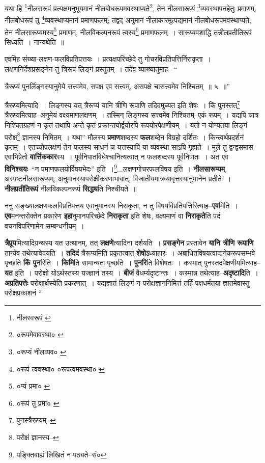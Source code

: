 \documentclass[article,12pt,a4paper]{memoir}
\begin{document}
	यथा हि \footnote{नीलस्वरूपं \cite{dp-msC} \cite{dp-msD}}\-नीलसरूपं प्रत्यक्षमनुभूयमानं नीलबोधरूपमवस्थाप्यते\footnote{०रूपमेवावस्था० \cite{dp-msC}}\-, तेन नीलसारूप्यं \footnote{०रूप्यं नीलव्यव० \cite{dp-msC}}\-व्यवस्थापनहेतुः प्रमाणम्, नीलबोधरूपं तु \footnote{०रूपं त्ववस्था० \cite{dp-msD} ०रूपत्वमवस्था० \cite{dp-msC}}\-व्यवस्थाप्यमानं प्रमाणफलम्; तद्वद् अनुमानं नीलाकारमुत्पद्यमानं नीलबोधरूपमवस्थाप्यते, तेन नीलसारूप्यमस्य\footnote{०प्यं प्रमा० \cite{dp-msC}} प्रमाणम्, नीलविकल्पनरूपं त्वस्य\footnote{०रूपं तु प्रमा० \cite{dp-msB} \cite{dp-msD}} प्रमाणफलम् । सारूप्यवशाद्धि तन्नीलप्रतीतिरूपं सिध्यति । नान्यथेति ॥ 
	  
	एवमिह संख्या-लक्षण-फलविप्रतिपत्तयः । प्रत्यक्षपरिच्छेदे तु गोचरविप्रतिपत्तिर्निराकृता । लक्षणनिर्देशप्रसङ्गेन तु त्रिरूपं लिङ्गं प्रस्तुतम् । तदेव व्याख्यातुमाह-- “
	  
	त्रैरूप्यं पुनर्लिङ्गस्यानुमेये सत्त्वमेव, सपक्ष एव सत्त्वम्, असपक्षे चासत्त्वमेव निश्चितम् ॥ ५ ॥” 
	  
	त्रैरूप्यमित्यादि । लिङ्गस्य यत् त्रैरूप्यं यानि त्रीणि रूपाणि तदिदमुच्यत इति शेषः । किं पुनस्तत्\footnote{पुनस्त्रैरूप्यम्--\cite{dp-msA}} त्रैरूप्यमित्याह--अनुमेयं वक्ष्यमाणलक्षणम् । तस्मिन् लिङ्गस्य सत्त्वमेव निश्चितम्--एकं रूपम् । यद्यपि चात्र निश्चितग्रहणं न कृतं तथापि अन्ते कृतं प्रक्रान्तयोर्द्वयोरपि रूपयोरपेक्षणीयम् । यतो न योग्यतया लिङ्गं परोक्ष\footnote{परोक्षं ज्ञानस्य--\cite{dp-msC}} ज्ञानस्य निमितम् । यथा” मौलस्य \textbf{प्रमाण}शब्दस्य \textbf{फल}शब्देन विग्रहो दर्शितः । किन्त्व\leavevmode{}र्थप्रदर्शनं कृतम् । एतच्चोपलक्षणं तेन फलस्य साधनं च यत्तस्यापि या व्यवस्था साऽपि गृह्यते । मूले तु द्वन्द्वसमास एवाभिप्रेतो \textbf{वार्त्तिककार}स्य । पूर्वनिपातविधेश्चानित्यत्वात् न फलशब्दस्य पूर्वनिपातः । अत एव \textbf{विनिश्चयः}--“न प्रमाणफलयोर्विषयभेदः” इति ।\footnote{पङ्क्तिबाह्यं लिखितं न पठ्यते--सं०}\-...लक्षणगोचरफलविषय इति । \textbf{नीलसारूप्यम्} अस्पष्टनीलसारूप्यम्, अनुमानस्यापरोक्षीकरणाभावात्, विजातीयमात्रव्यावृत्तस्यानुमानेन प्रतीतेः । \textbf{नीलप्रतीतिरूपं} नीलविकल्पनरूपं \textbf{सिद्ध्य}ति निश्चीयते ॥
	\pend
      

	  \pstart ननु सङ्ख्यालक्षणफलविप्रतिपत्तय एवानुमानस्य निराकृता, न तु विषयविप्रतिपत्तिरित्याह--\textbf{एव}मिति । \textbf{एव}मनन्तरोक्तेन प्रकारेण \textbf{इहा}नुमानपरिच्छेदे \textbf{निराकृता} इति शेषः, वक्ष्यमाणं वा \textbf{निराकृते}ति पदं वचनविपरिणामेन सम्बन्धनीयम् ।
	\pend
      

	  \pstart \textbf{त्रैप्रूय}मित्यादिग्रन्थस्य यत उत्थानम्, तत् \textbf{लक्षणे}त्यादिना दर्शयति । \textbf{प्रसङ्गेन} प्रस्तावेन \textbf{यानि त्रीणि रूपाणि} तान्येव तथेत्यावेदयति । \textbf{तदिदं} त्रैरूप्यमिति प्रकृतत्वात् \textbf{शेषोऽ}ध्याहारः । अबाधितविषयत्वाद्यनेकरूपसम्भवे पृच्छति \textbf{किं पुन}रिति । \textbf{किमि}ति सामान्यतः पृच्छति । \textbf{पुनरि}ति विशेषतः । कस्मात् पुनस्तदपेक्षणीयमित्याह--\textbf{यत} इति । परोक्षो योऽर्थस्तस्य यज्ज्ञानं तस्य । \textbf{बीजं} वैधर्म्यदृष्टान्तः । कस्मान्न तथेत्याह--\textbf{अदृष्टादि}ति । \textbf{अप्रतिपत्तेः} परोक्षार्थस्येति प्रकरणात् । यद्यज्ञातं लिङ्गं न परोक्षज्ञाननिमित्तं तर्हि पक्षधर्मतया ज्ञातमेवास्तु परोक्षप्रकाशनं  \leavevmode{} “
	  
\end{document}
